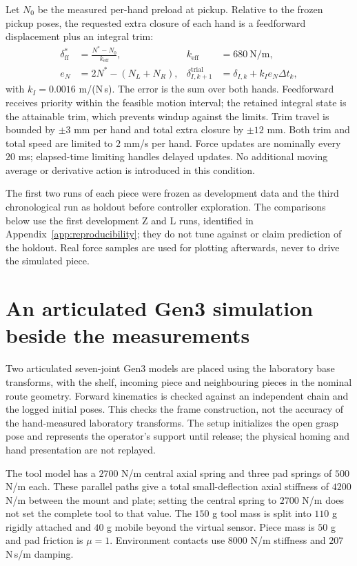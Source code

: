 Let $N_0$ be the measured per-hand preload at pickup. Relative to the frozen pickup poses, the requested extra closure of each hand is a feedforward displacement plus an integral trim:
\begin{align}
\delta_{\mathrm{ff}}^*&=\frac{N^*-N_0}{k_{\mathrm{eff}}}, & k_{\mathrm{eff}}&=680\ \mathrm{N/m},\nonumber\\
e_N&=2N^*-(N_L+N_R), &
\delta_{I,k+1}^{\mathrm{trial}}&=\delta_{I,k}+k_I e_N\Delta t_k,
\label{eq:kinova-ffi}
\end{align}
with $k_I=0.0016$ m/(N\,s). The error is the sum over both hands. Feedforward receives priority within the feasible motion interval; the retained integral state is the attainable trim, which prevents windup against the limits. Trim travel is bounded by $\pm3$ mm per hand and total extra closure by $\pm12$ mm. Both trim and total speed are limited to $2$ mm/s per hand. Force updates are nominally every $20$ ms; elapsed-time limiting handles delayed updates. No additional moving average or derivative action is introduced in this condition.

The first two runs of each piece were frozen as development data and the third chronological run as holdout before controller exploration. The comparisons below use the first development Z and L runs, identified in Appendix~\ref{app:reproducibility}; they do not tune against or claim prediction of the holdout. Real force samples are used for plotting afterwards, never to drive the simulated piece.

\section{An articulated Gen3 simulation beside the measurements}
\label{sec:kinova-sim-comparison}

Two articulated seven-joint Gen3 models are placed using the laboratory base transforms, with the shelf, incoming piece and neighbouring pieces in the nominal route geometry. Forward kinematics is checked against an independent chain and the logged initial poses. This checks the frame construction, not the accuracy of the hand-measured laboratory transforms. The setup initializes the open grasp pose and represents the operator's support until release; the physical homing and hand presentation are not replayed.

The tool model has a $2700$ N/m central axial spring and three pad springs of $500$ N/m each. These parallel paths give a total small-deflection axial stiffness of $4200$ N/m between the mount and plate; setting the central spring to $2700$ N/m does not set the complete tool to that value. The $150$ g tool mass is split into $110$ g rigidly attached and $40$ g mobile beyond the virtual sensor. Piece mass is $50$ g and pad friction is $\mu=1$. Environment contacts use $8000$ N/m stiffness and $207$ N\,s/m damping.

